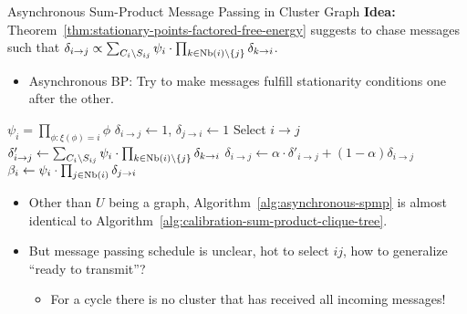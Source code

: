 \begin{frame}{Asynchronous Sum-Product Message Passing in Cluster Graph}
    \textbf{Idea:} Theorem~\ref{thm:stationary-points-factored-free-energy} suggests to chase messages such that $\delta_{i \rightarrow j} \propto \sum_{C_i \backslash S_{ij}} \psi_i \cdot \prod_{k \in \text{Nb}(i) \backslash \{j\}} \delta_{k \rightarrow i}$.
    \pause
    \begin{itemize}
        \item Asynchronous BP: Try to make messages fulfill stationarity conditions one after the other.
    \end{itemize}
    \pause
    \begin{minipage}{0.6\textwidth}
\begin{algorithm}[H]
    \caption{Asynchronous Sum-Product Message Passing in Cluster Graph}
    \label{alg:asynchronous-spmp}
    {
        $\psi_i = \prod_{\phi: \xi(\phi) = i} \phi$\;
    }
    \pause
    {
        $\delta_{i \rightarrow j} \leftarrow 1$, $\delta_{j \rightarrow i} \leftarrow 1$\;
    }
    \pause
    {
        Select $i \rightarrow j$\;
        \pause
        $\delta'_{i \rightarrow j} \leftarrow \sum_{C_i \backslash S_{ij}} \psi_i \cdot \prod_{k \in \text{Nb}(i) \backslash \{j\}} \delta_{k \rightarrow i}$\;
        \pause
        $\delta_{i \rightarrow j} \leftarrow \alpha \cdot \delta'_{i \rightarrow j} + (1-\alpha) \delta_{i \rightarrow j}$\;
    }
    \pause
    {
        $\beta_i \leftarrow \psi_i \cdot \prod_{j \in \text{Nb}(i)} \delta_{j \rightarrow i}$\;
    }
\end{algorithm}
\end{minipage}
    \begin{minipage}{0.39\textwidth}
\begin{itemize}
    \pause \item Other than $U$ being a graph, Algorithm~\ref{alg:asynchronous-spmp} is almost identical to Algorithm~\ref{alg:calibration-sum-product-clique-tree}.
    \pause \item But message passing schedule is unclear, hot to select $ij$, how to generalize ``ready to transmit''?
    \begin{itemize}
        \pause \item For a cycle there is no cluster that has received all incoming messages!

\end{itemize}
\end{itemize}
\end{minipage}
\end{frame}
